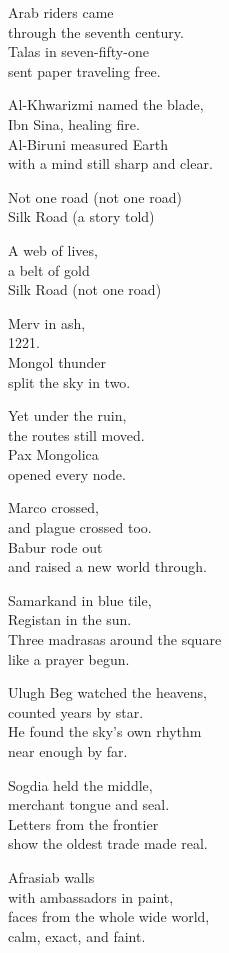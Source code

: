 \begin{lyrics}
Arab riders came\\
through the seventh century.\\
Talas in seven-fifty-one\\
sent paper traveling free.

Al-Khwarizmi named the blade,\\
Ibn Sina, healing fire.\\
Al-Biruni measured Earth\\
with a mind still sharp and clear.

Not one road
(not one road)\\
Silk Road
(a story told)

A web of lives,\\
a belt of gold\\
Silk Road
(not one road)

Merv in ash,\\
1221.\\
Mongol thunder\\
split the sky in two.

Yet under the ruin,\\
the routes still moved.\\
Pax Mongolica\\
opened every node.

Marco crossed,\\
and plague crossed too.\\
Babur rode out\\
and raised a new world through.

Samarkand in blue tile,\\
Registan in the sun.\\
Three madrasas around the square\\
like a prayer begun.

Ulugh Beg watched the heavens,\\
counted years by star.\\
He found the sky’s own rhythm\\
near enough by far.

Sogdia held the middle,\\
merchant tongue and seal.\\
Letters from the frontier\\
show the oldest trade made real.

Afrasiab walls\\
with ambassadors in paint,\\
faces from the whole wide world,\\
calm, exact, and faint.


\end{lyrics}
